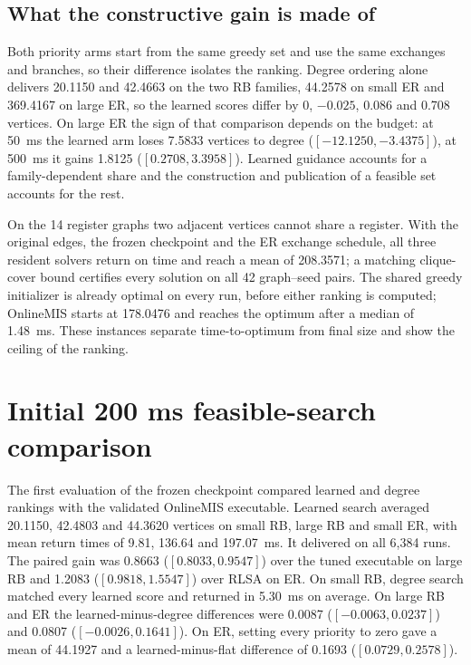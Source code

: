 \subsection{What the constructive gain is made of}
\label{app:gain-sources}
Both priority arms start from the same greedy set and use the same exchanges and branches, so their difference isolates the ranking. Degree ordering alone delivers 20.1150 and 42.4663 on the two RB families, 44.2578 on small ER and 369.4167 on large ER, so the learned scores differ by 0, $-0.025$, 0.086 and 0.708 vertices. On large ER the sign of that comparison depends on the budget: at 50~ms the learned arm loses 7.5833 vertices to degree ($[-12.1250,-3.4375]$), at 500~ms it gains 1.8125 ($[0.2708,3.3958]$). Learned guidance accounts for a family-dependent share and the construction and publication of a feasible set accounts for the rest.

On the 14 register graphs two adjacent vertices cannot share a register. With the original edges, the frozen checkpoint and the ER exchange schedule, all three resident solvers return on time and reach a mean of 208.3571; a matching clique-cover bound certifies every solution on all 42 graph--seed pairs. The shared greedy initializer is already optimal on every run, before either ranking is computed; OnlineMIS starts at 178.0476 and reaches the optimum after a median of 1.48~ms. These instances separate time-to-optimum from final size and show the ceiling of the ranking.

\section{Initial 200 ms feasible-search comparison}
\label{app:initial-priority}
The first evaluation of the frozen checkpoint compared learned and degree rankings with the validated OnlineMIS executable. Learned search averaged 20.1150, 42.4803 and 44.3620 vertices on small RB, large RB and small ER, with mean return times of 9.81, 136.64 and 197.07~ms. It delivered on all 6,384 runs. The paired gain was 0.8663 ($[0.8033,0.9547]$) over the tuned executable on large RB and 1.2083 ($[0.9818,1.5547]$) over RLSA on ER. On small RB, degree search matched every learned score and returned in 5.30~ms on average. On large RB and ER the learned-minus-degree differences were 0.0087 ($[-0.0063,0.0237]$) and 0.0807 ($[-0.0026,0.1641]$). On ER, setting every priority to zero gave a mean of 44.1927 and a learned-minus-flat difference of 0.1693 ($[0.0729,0.2578]$).

